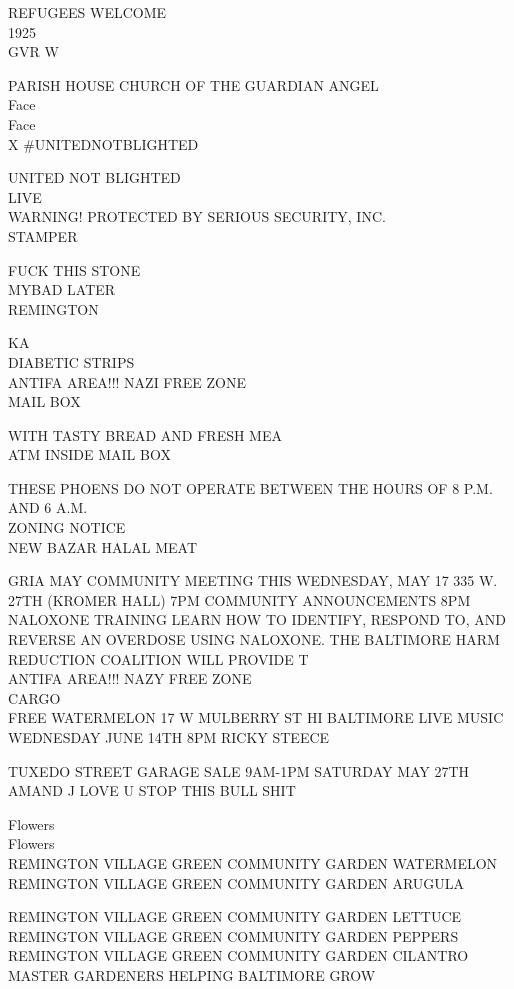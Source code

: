 \documentclass[10pt,letterpaper]{article}
\begin{document}
REFUGEES WELCOME\\
1925\\
GVR W

PARISH HOUSE CHURCH OF THE GUARDIAN ANGEL\\
Face\\
Face\\
X \#UNITEDNOTBLIGHTED

UNITED NOT BLIGHTED\\
LIVE\\
WARNING!  PROTECTED BY SERIOUS SECURITY, INC.\\
STAMPER

FUCK THIS STONE\\
MYBAD LATER\\
REMINGTON

KA\\
DIABETIC STRIPS\\
ANTIFA AREA!!! NAZI FREE ZONE\\
MAIL BOX

WITH TASTY BREAD AND FRESH MEA\\
ATM INSIDE MAIL BOX

THESE PHOENS DO NOT OPERATE BETWEEN THE HOURS OF 8 P.M. AND 6 A.M.\\
ZONING NOTICE\\
NEW BAZAR HALAL MEAT

GRIA MAY COMMUNITY MEETING THIS WEDNESDAY, MAY 17 335 W. 27TH (KROMER HALL) 7PM COMMUNITY ANNOUNCEMENTS 8PM NALOXONE TRAINING LEARN HOW TO IDENTIFY, RESPOND TO, AND REVERSE AN OVERDOSE USING NALOXONE.  THE BALTIMORE HARM REDUCTION COALITION WILL PROVIDE T\\
ANTIFA AREA!!! NAZY FREE ZONE\\
CARGO\\
FREE WATERMELON 17 W MULBERRY ST HI BALTIMORE LIVE MUSIC WEDNESDAY JUNE 14TH 8PM RICKY STEECE

TUXEDO STREET GARAGE SALE 9AM{-}1PM SATURDAY MAY 27TH\\
AMAND J LOVE U STOP THIS BULL SHIT

Flowers\\
Flowers\\
REMINGTON VILLAGE GREEN COMMUNITY GARDEN WATERMELON\\
REMINGTON VILLAGE GREEN COMMUNITY GARDEN ARUGULA

REMINGTON VILLAGE GREEN COMMUNITY GARDEN LETTUCE\\
REMINGTON VILLAGE GREEN COMMUNITY GARDEN PEPPERS\\
REMINGTON VILLAGE GREEN COMMUNITY GARDEN CILANTRO\\
MASTER GARDENERS HELPING BALTIMORE GROW
\end{document}
